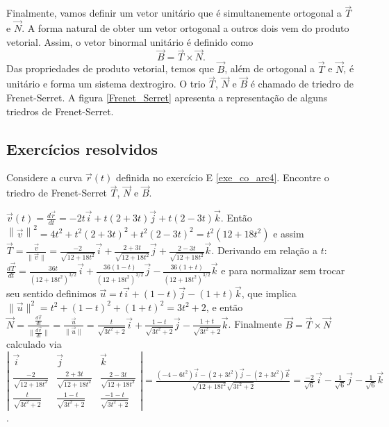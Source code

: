 Finalmente, vamos definir um vetor unitário que é simultanemente ortogonal a $\vec{T}$ e $\vec{N}$. A forma natural de obter um vetor ortogonal a outros dois vem do produto vetorial. Assim, o vetor binormal unitário é definido como
$$
\vec{B}=\vec{T}\times\vec{N}.
$$
Das propriedades de produto vetorial, temos que $\vec{B}$, além de ortogonal a $\vec{T}$ e $\vec{N}$, é unitário e forma um sistema dextrogiro. O trio $\vec{T}$, $\vec{N}$ e $\vec{B}$ é chamado de triedro de Frenet-Serret. A figura \ref{Frenet_Serret} apresenta a representação de alguns triedros de Frenet-Serret.


\subsection*{Exercícios resolvidos}




\begin{exeresol}
  Considere a curva $\vec{r}(t)$ definida no exercício E \ref{exe_co_arc4}. Encontre o triedro de Frenet-Serret $\vec{T}$, $\vec{N}$ e $\vec{B}$.
\end{exeresol}
\begin{resol}
 $\vec{v}(t) = \frac{d \vec{r}}{dt} = -2t \vec{i} + t(2+3t) \vec{j} + t(2-3t)\vec{k}$. Então $\left\|\vec{v} \right\|^2 = 4t^2 + t^2(2+3t)^2 + t^2(2-3t)^2 = t^2(12+18t^2)$ e assim $\vec{T} = \frac{\vec{v}}{\|\vec{v}\|} = \frac{-2 }{\sqrt{12+18t^2}}\vec{i} + \frac{2+3t}{\sqrt{12+18t^2}}\vec{j} + \frac{2-3t}{\sqrt{12+18t^2}}\vec{k}$. Derivando em relação a $t$: $\frac{d\vec{T}}{dt} = \frac{36t}{(12+18t^2)^{3/2}} \vec{i} + \frac{36(1-t)}{(12+18t^2)^{3/2}} \vec{j} - \frac{36(1+t)}{(12+18t^2)^{3/2}} \vec{k} $ e para normalizar sem trocar seu sentido definimos $\vec{u} = t \vec{i} + (1-t) \vec{j} - (1+t)\vec{k}$, que implica $\|\vec{u}\|^2=t^2 + (1-t)^2 + (1+t)^2 = 3t^2 + 2$, e então $\vec{N} = \frac{\frac{d\vec{v}}{dt}}{\|\frac{d\vec{v}}{dt}\|} = \frac{\vec{u}}{\|\vec{u}\|}=\frac{t}{\sqrt{3t^2+2}} \vec{i} + \frac{1-t}{\sqrt{3t^2+2}} \vec{j} - \frac{1+t}{\sqrt{3t^2+2}} \vec{k}$. Finalmente $ \vec{B} = \vec{T} \times \vec{N}$ calculado via $\left| \begin{array}{ccc}
\vec{i} & \vec{j} & \vec{k} \\
\frac{-2}{\sqrt{12+18t^2}} & \frac{2+3t}{\sqrt{12+18t^2}} & \frac{2-3t}{\sqrt{12+18t^2}} \\
\frac{t}{\sqrt{3t^2+2}} & \frac{1-t}{\sqrt{3t^2+2}} &  \frac{-1-t}{\sqrt{3t^2+2}} \end{array} \right| = \frac{(-4-6t^2)\vec{i} - (2+3t^2)\vec{j} - (2+3t^2)\vec{k}}{ \sqrt{12+18t^2} \sqrt{3t^2+2}} = \frac{-2}{\sqrt{6}} \vec{i} - \frac{1}{\sqrt{6}} \vec{j} - \frac{1}{\sqrt{6}} \vec{k}$.
\end{resol}

